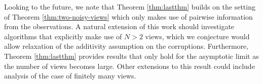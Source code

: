 Looking to the future, we note that Theorem \ref{thm:lastthm} builds on the setting of Theorem \ref{thm:two-noisy-views} which only makes use of pairwise information from the observations.
A natural extension of this work should investigate algorithms that explicitly make use of $N>2$ views, which we conjecture would allow relaxation of the additivity assumption on the corruptions.
Furthermore, Theorem \ref{thm:lastthm} provides results that only hold for the asymptotic limit as the number of views becomes large.
Other extensions to this result could include analysis of the case of finitely many views.





